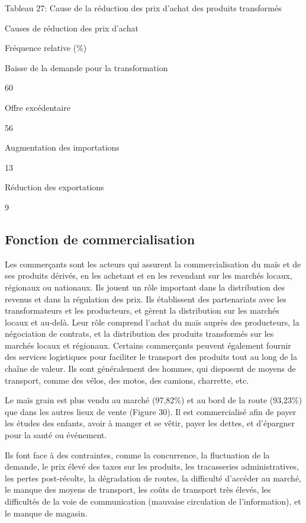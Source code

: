 \documentclass[12pt,oneside]{report}
\begin{document}
Tableau 27: Cause de la réduction des prix d'achat des produits transformés

Causes de réduction des prix d'achat

Fréquence relative (\%)

Baisse de la demande pour la transformation

60

Offre excédentaire

56

Augmentation des importations

13

Réduction des exportations

9

\subsection{Fonction de commercialisation}
Les commerçants sont les acteurs qui assurent la commercialisation du maïs et de ses produits dérivés, en les achetant et en les revendant sur les marchés locaux, régionaux ou nationaux. Ils jouent un rôle important dans la distribution des revenus et dans la régulation des prix. Ils établissent des partenariats avec les transformateurs et les producteurs, et gèrent la distribution sur les marchés locaux et au-delà. Leur rôle comprend l'achat du maïs auprès des producteurs, la négociation de contrats, et la distribution des produits transformés sur les marchés locaux et régionaux. Certains commerçants peuvent également fournir des services logistiques pour faciliter le transport des produits tout au long de la chaîne de valeur. Ils sont généralement des hommes, qui disposent de moyens de transport, comme des vélos, des motos, des camions, charrette, etc.

Le maïs grain est plus vendu au marché (97,82\%) et au bord de la route (93,23\%) que dans les autres lieux de vente (Figure 30). Il est commercialisé afin de payer les études des enfants, avoir à manger et se vêtir, payer les dettes, et d’épargner pour la santé ou événement.

Ils font face à des contraintes, comme la concurrence, la fluctuation de la demande, le prix élevé des taxes sur les produits, les tracasseries administratives, les pertes post-récolte, la dégradation de routes, la difficulté d'accéder au marché, le manque des moyens de transport, les coûts de transport très élevés, les difficultés de la voie de communication (mauvaise circulation de l’information), et le manque de magasin.
\end{document}
